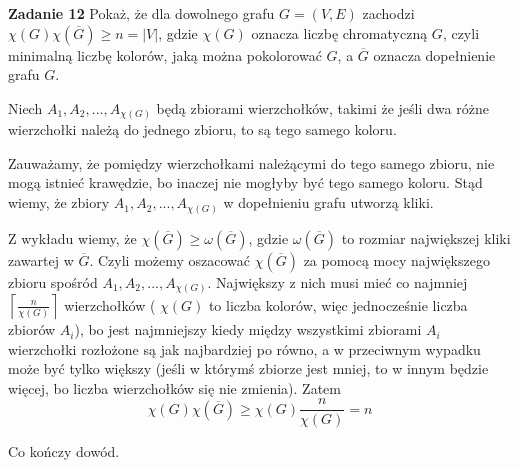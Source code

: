 \documentclass[12pt,a4paper]{article}
\begin{document}
\vskip 1cm
\noindent
\textbf{Zadanie 12} Pokaż, że dla dowolnego grafu \( G=(V,E) \) zachodzi \( \chi(G) \chi(\overline{G}) \geq n = |V| \), gdzie \( \chi(G) \) oznacza liczbę chromatyczną \(G\), czyli minimalną liczbę kolorów, jaką można pokolorować \(G\), a \( \overline{G} \) oznacza dopełnienie grafu \(G\).
\vskip 0.2cm

Niech \(A_1, A_2,...,A_{\chi(G)}\) będą zbiorami wierzchołków, takimi że jeśli dwa różne wierzchołki należą do jednego zbioru, to są tego samego koloru. 

Zauważamy, że pomiędzy wierzchołkami należącymi do tego samego zbioru, nie mogą istnieć krawędzie, bo inaczej nie mogłyby być tego samego koloru. Stąd wiemy, że zbiory \(A_1, A_2,...,A_{\chi(G)}\) w dopełnieniu grafu utworzą kliki.

Z wykładu wiemy, że \( \chi(\overline{G}) \geq \omega(\overline{G}) \), gdzie \( \omega(\overline{G}) \) to rozmiar największej kliki zawartej w \( \overline{G} \). Czyli możemy oszacować \( \chi(\overline{G}) \) za pomocą mocy największego zbioru spośród \(A_1, A_2,...,A_{\chi(G)}\). Największy z nich musi mieć co najmniej \( \left\lceil \frac{n}{\chi(G)} \right\rceil \) wierzchołków ( \(\chi(G)\) to liczba kolorów, więc jednocześnie liczba zbiorów \(A_i\)), bo jest najmniejszy kiedy między wszystkimi zbiorami \(A_i\) wierzchołki rozłożone są jak najbardziej po równo, a w przeciwnym wypadku może być tylko większy (jeśli w którymś zbiorze jest mniej, to w innym będzie więcej, bo liczba wierzchołków się nie zmienia). Zatem
\[
	\chi(G) \chi(\overline{G}) \geq \chi(G)\frac{n}{\chi(G)} = n
\]

Co kończy dowód.
\end{document}
